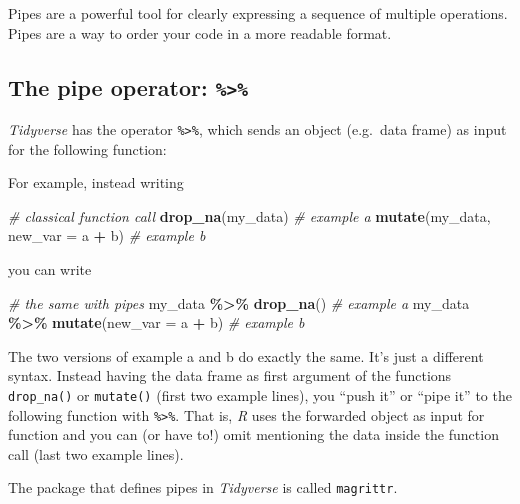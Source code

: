 \documentclass[
]{scrartcl}
\makeatletter
\newenvironment{Shaded}{\begin{snugshade}}{\end{snugshade}}
\newcommand{\AttributeTok}[1]{\textcolor[rgb]{0.13,0.29,0.53}{#1}}
\newcommand{\CommentTok}[1]{\textcolor[rgb]{0.56,0.35,0.01}{\textit{#1}}}
\newcommand{\FunctionTok}[1]{\textcolor[rgb]{0.13,0.29,0.53}{\textbf{#1}}}
\newcommand{\NormalTok}[1]{#1}
\newcommand{\SpecialCharTok}[1]{\textcolor[rgb]{0.81,0.36,0.00}{\textbf{#1}}}
\newenvironment{kframe}{%
\medskip{}
\setlength{\fboxsep}{.8em}
 \def\at@end@of@kframe{}%
 \ifinner\ifhmode%
  \def\at@end@of@kframe{\end{minipage}}%
  \begin{minipage}{\columnwidth}%
 \fi\fi%
 \def\FrameCommand##1{\hskip\@totalleftmargin \hskip-\fboxsep
 \colorbox{shadecolor}{##1}\hskip-\fboxsep
     \hskip-\linewidth \hskip-\@totalleftmargin \hskip\columnwidth}%
 \MakeFramed {\advance\hsize-\width
   \@totalleftmargin\z@ \linewidth\hsize
   \@setminipage}}%
 {\par\unskip\endMakeFramed%
 \at@end@of@kframe}
\newenvironment{rmdblock}[1]
  {
  \begin{itemize}
  \renewcommand{\labelitemi}{
    \raisebox{-.7\height}[0pt][0pt]{
      {\setkeys{Gin}{width=3em,keepaspectratio}\texttt{[image: images/\#1]}}
    }
  }
  \setlength{\fboxsep}{1em}
  \begin{kframe}
  \item
  }
  {
  \end{kframe}
  \end{itemize}
  }
\newenvironment{geek}
    {\begin{rmdblock}{geek}}
    {\end{rmdblock}}
\makeatother
\begin{document}
Pipes are a powerful tool for clearly expressing a sequence of multiple operations. Pipes are a way to order your code in a more readable format.

\hypertarget{the-pipe-operator}{%
\subsection{\texorpdfstring{The pipe operator: \texttt{\%\textgreater{}\%}}{The pipe operator: \%\textgreater\%}}\label{the-pipe-operator}}

\emph{Tidyverse} has the operator \texttt{\%\textgreater{}\%}, which sends an object (e.g.~data frame) as input for the following function:

For example, instead writing

\begin{Shaded}
\begin{Highlighting}[]
\CommentTok{\# classical function call}
\FunctionTok{drop\_na}\NormalTok{(my\_data)                }\CommentTok{\# example a}
\FunctionTok{mutate}\NormalTok{(my\_data, }\AttributeTok{new\_var =}\NormalTok{ a }\SpecialCharTok{+}\NormalTok{ b) }\CommentTok{\# example b}
\end{Highlighting}
\end{Shaded}

you can write

\begin{Shaded}
\begin{Highlighting}[]
\CommentTok{\# the same with pipes}
\NormalTok{my\_data }\SpecialCharTok{\%\textgreater{}\%} \FunctionTok{drop\_na}\NormalTok{()                }\CommentTok{\# example a}
\NormalTok{my\_data }\SpecialCharTok{\%\textgreater{}\%} \FunctionTok{mutate}\NormalTok{(}\AttributeTok{new\_var =}\NormalTok{ a }\SpecialCharTok{+}\NormalTok{ b)  }\CommentTok{\# example b}
\end{Highlighting}
\end{Shaded}

The two versions of example a and b do exactly the same. It's just a different syntax. Instead having the data frame as first argument of the functions \texttt{drop\_na()} or \texttt{mutate()} (first two example lines), you ``push it'' or ``pipe it'' to the following function with \texttt{\%\textgreater{}\%}. That is, \emph{R} uses the forwarded object as input for function and you can (or have to!) omit mentioning the data inside the function call (last two example lines).

\begin{geek}
The package that defines pipes in \emph{Tidyverse} is called
\texttt{magrittr}.
\end{geek}
\end{document}

